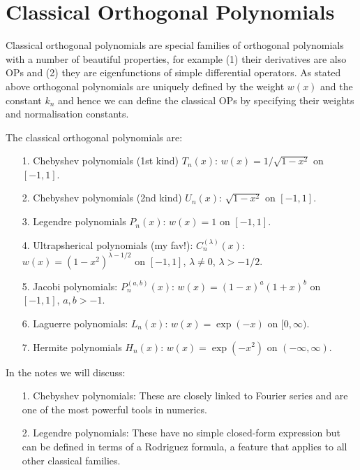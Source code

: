 
\section{Classical Orthogonal Polynomials}
Classical orthogonal polynomials are special families of orthogonal polynomials with a number of beautiful properties, for example (1) their derivatives are also OPs and (2) they are eigenfunctions of simple differential operators. As stated above orthogonal polynomials are uniquely defined by the weight $w(x)$ and the constant $k_n$ and hence we can define the classical OPs by specifying their weights and normalisation constants.

The classical orthogonal polynomials are:

\begin{itemize}
\item[1. ] Chebyshev polynomials (1st kind) $T_n(x)$: $w(x) = 1/\sqrt{1-x^2}$ on $[-1,1]$.


\item[2. ] Chebyshev polynomials (2nd kind) $U_n(x)$: $\sqrt{1-x^2}$ on $[-1,1]$.


\item[3. ] Legendre polynomials $P_n(x)$: $w(x) = 1$ on $[-1,1]$.


\item[4. ] Ultrapsherical polynomials (my fav!): $C_n^{(\ensuremath{\lambda})}(x)$: $w(x) = (1-x^2)^{\ensuremath{\lambda}-1/2}$ on $[-1,1]$, $\ensuremath{\lambda} \ensuremath{\neq} 0$, $\ensuremath{\lambda} > -1/2$.


\item[5. ] Jacobi polynomials: $P_n^{(a,b)}(x)$: $w(x) = (1-x)^a (1+x)^b$ on $[-1,1]$, $a,b > -1$.


\item[6. ] Laguerre polynomials: $L_n(x)$: $w(x) = \exp(-x)$ on $[0,\ensuremath{\infty})$.


\item[7. ] Hermite polynomials $H_n(x)$: $w(x) = \exp(-x^2)$  on $(-\ensuremath{\infty},\ensuremath{\infty})$.

\end{itemize}
In the notes we will discuss:

\begin{itemize}
\item[1. ] Chebyshev polynomials: These are closely linked to Fourier series and are one of the most powerful tools in numerics.


\item[2. ] Legendre polynomials: These have no simple closed-form expression but can be defined in terms of a Rodriguez formula, a feature that applies to all other classical families.

\end{itemize}
